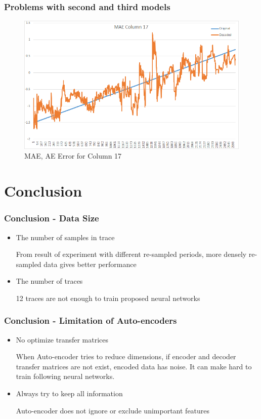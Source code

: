 \documentclass{beamer}
\begin{document}
\begin{frame}
\frametitle{Problems with second and third models}
\begin{figure}[t!]
    \centering
    \includegraphics[width=\textwidth]{../paper/pictures/result_pictures/MAE_Column_17.png}
    \caption{MAE, AE Error for Column 17}
    \label{fig:mae_error_c17}
\end{figure}
\end{frame}

\section{Conclusion}
\begin{frame}
\frametitle{Conclusion - Data Size}
\begin{itemize}
\item The number of samples in trace

From result of experiment with different re-sampled periods, more densely re-sampled data gives better performance

\item The number of traces

12 traces are not enough to train proposed neural networks

\end{itemize}
\end{frame}

\begin{frame}
\frametitle{Conclusion - Limitation of Auto-encoders}
\begin{itemize}
\item No optimize transfer matrices

When Auto-encoder tries to reduce dimensions, if encoder and decoder transfer matrices are not exist, encoded data has noise. It can make hard to train following neural networks.

\item Always try to keep all information

Auto-encoder does not ignore or exclude unimportant features

\end{itemize}
\end{frame}
\end{document}
